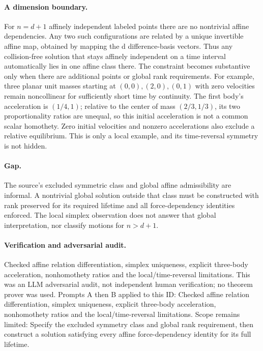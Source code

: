 \documentclass[11pt]{article}
\begin{document}
\paragraph{A dimension boundary.}For \(n=d+1\) affinely independent labeled points there are no nontrivial affine dependencies. Any two such configurations are related by a unique invertible affine map, obtained by mapping the d difference-basis vectors. Thus any collision-free solution that stays affinely independent on a time interval automatically lies in one affine class there. The constraint becomes substantive only when there are additional points or global rank requirements.
For example, three planar unit masses starting at \((0,0),(2,0),(0,1)\) with zero velocities remain noncollinear for sufficiently short time by continuity. The first body's acceleration is \((1/4,1)\); relative to the center of mass \((2/3,1/3)\), its two proportionality ratios are unequal, so this initial acceleration is not a common scalar homothety. Zero initial velocities and nonzero accelerations also exclude a relative equilibrium. This is only a local example, and its time-reversal symmetry is not hidden.
\paragraph{Gap.}The source's excluded symmetric class and global affine admissibility are informal. A nontrivial global solution outside that class must be constructed with rank preserved for its required lifetime and all force-dependency identities enforced. The local simplex observation does not answer that global interpretation, nor classify motions for \(n>d+1\).

\paragraph{Verification and adversarial audit.}
Checked affine relation differentiation, simplex uniqueness, explicit three-body acceleration, nonhomothety ratios and the local/time-reversal limitations. This was an LLM adversarial audit, not independent human verification; no theorem prover was used. Prompts A then B applied to this ID: Checked affine relation differentiation, simplex uniqueness, explicit three-body acceleration, nonhomothety ratios and the local/time-reversal limitations. Scope remains limited: Specify the excluded symmetry class and global rank requirement, then construct a solution satisfying every affine force-dependency identity for its full lifetime.
\end{document}
